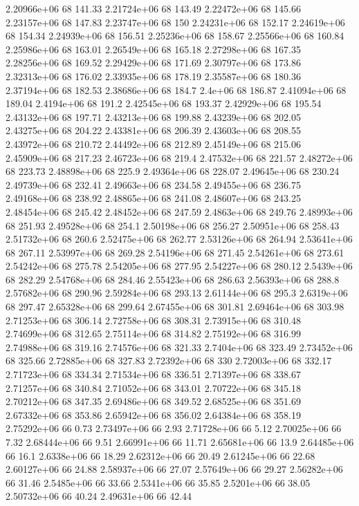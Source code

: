 2.20966e+06 68 141.33
2.21724e+06 68 143.49
2.22472e+06 68 145.66
2.23157e+06 68 147.83
2.23747e+06 68 150
2.24231e+06 68 152.17
2.24619e+06 68 154.34
2.24939e+06 68 156.51
2.25236e+06 68 158.67
2.25566e+06 68 160.84
2.25986e+06 68 163.01
2.26549e+06 68 165.18
2.27298e+06 68 167.35
2.28256e+06 68 169.52
2.29429e+06 68 171.69
2.30797e+06 68 173.86
2.32313e+06 68 176.02
2.33935e+06 68 178.19
2.35587e+06 68 180.36
2.37194e+06 68 182.53
2.38686e+06 68 184.7
2.4e+06 68 186.87
2.41094e+06 68 189.04
2.4194e+06 68 191.2
2.42545e+06 68 193.37
2.42929e+06 68 195.54
2.43132e+06 68 197.71
2.43213e+06 68 199.88
2.43239e+06 68 202.05
2.43275e+06 68 204.22
2.43381e+06 68 206.39
2.43603e+06 68 208.55
2.43972e+06 68 210.72
2.44492e+06 68 212.89
2.45149e+06 68 215.06
2.45909e+06 68 217.23
2.46723e+06 68 219.4
2.47532e+06 68 221.57
2.48272e+06 68 223.73
2.48898e+06 68 225.9
2.49364e+06 68 228.07
2.49645e+06 68 230.24
2.49739e+06 68 232.41
2.49663e+06 68 234.58
2.49455e+06 68 236.75
2.49168e+06 68 238.92
2.48865e+06 68 241.08
2.48607e+06 68 243.25
2.48454e+06 68 245.42
2.48452e+06 68 247.59
2.4863e+06 68 249.76
2.48993e+06 68 251.93
2.49528e+06 68 254.1
2.50198e+06 68 256.27
2.50951e+06 68 258.43
2.51732e+06 68 260.6
2.52475e+06 68 262.77
2.53126e+06 68 264.94
2.53641e+06 68 267.11
2.53997e+06 68 269.28
2.54196e+06 68 271.45
2.54261e+06 68 273.61
2.54242e+06 68 275.78
2.54205e+06 68 277.95
2.54227e+06 68 280.12
2.5439e+06 68 282.29
2.54768e+06 68 284.46
2.55423e+06 68 286.63
2.56393e+06 68 288.8
2.57682e+06 68 290.96
2.59284e+06 68 293.13
2.61144e+06 68 295.3
2.6319e+06 68 297.47
2.65328e+06 68 299.64
2.67455e+06 68 301.81
2.69464e+06 68 303.98
2.71253e+06 68 306.14
2.72758e+06 68 308.31
2.73915e+06 68 310.48
2.74699e+06 68 312.65
2.75114e+06 68 314.82
2.75192e+06 68 316.99
2.74988e+06 68 319.16
2.74576e+06 68 321.33
2.7404e+06 68 323.49
2.73452e+06 68 325.66
2.72885e+06 68 327.83
2.72392e+06 68 330
2.72003e+06 68 332.17
2.71723e+06 68 334.34
2.71534e+06 68 336.51
2.71397e+06 68 338.67
2.71257e+06 68 340.84
2.71052e+06 68 343.01
2.70722e+06 68 345.18
2.70212e+06 68 347.35
2.69486e+06 68 349.52
2.68525e+06 68 351.69
2.67332e+06 68 353.86
2.65942e+06 68 356.02
2.64384e+06 68 358.19
2.75292e+06 66 0.73
2.73497e+06 66 2.93
2.71728e+06 66 5.12
2.70025e+06 66 7.32
2.68444e+06 66 9.51
2.66991e+06 66 11.71
2.65681e+06 66 13.9
2.64485e+06 66 16.1
2.6338e+06 66 18.29
2.62312e+06 66 20.49
2.61245e+06 66 22.68
2.60127e+06 66 24.88
2.58937e+06 66 27.07
2.57649e+06 66 29.27
2.56282e+06 66 31.46
2.5485e+06 66 33.66
2.5341e+06 66 35.85
2.5201e+06 66 38.05
2.50732e+06 66 40.24
2.49631e+06 66 42.44
